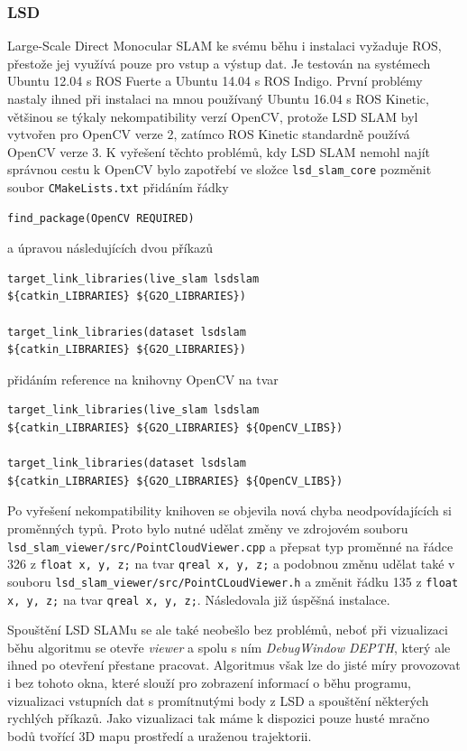 \documentclass[12pt,a4paper]{article}
\begin{document}
\subsubsection{LSD}
Large-Scale Direct Monocular SLAM ke svému běhu i instalaci vyžaduje ROS, přestože jej využívá pouze pro vstup a výstup dat. Je testován na systémech Ubuntu 12.04 s ROS Fuerte a Ubuntu 14.04 s ROS Indigo. První problémy nastaly ihned při instalaci na mnou používaný Ubuntu 16.04 s ROS Kinetic, většinou se týkaly nekompatibility verzí OpenCV, protože LSD SLAM byl vytvořen pro OpenCV verze 2, zatímco ROS Kinetic standardně používá OpenCV verze 3. K vyřešení těchto problémů, kdy LSD SLAM nemohl najít správnou cestu k OpenCV bylo zapotřebí ve složce \texttt{lsd\_slam\_core} pozměnit soubor \texttt{CMakeLists.txt} přidáním řádky
\begin{verbatim}
find_package(OpenCV REQUIRED)
\end{verbatim}
a úpravou následujících dvou příkazů
\begin{verbatim}
target_link_libraries(live_slam lsdslam 
${catkin_LIBRARIES} ${G2O_LIBRARIES})

target_link_libraries(dataset lsdslam 
${catkin_LIBRARIES} ${G2O_LIBRARIES})
\end{verbatim}
přidáním reference na knihovny OpenCV na tvar
\begin{verbatim}
target_link_libraries(live_slam lsdslam 
${catkin_LIBRARIES} ${G2O_LIBRARIES} ${OpenCV_LIBS})

target_link_libraries(dataset lsdslam 
${catkin_LIBRARIES} ${G2O_LIBRARIES} ${OpenCV_LIBS})
\end{verbatim}

Po vyřešení nekompatibility knihoven se objevila nová chyba neodpovídajících si \newline proměnných typů. Proto bylo nutné udělat změny ve zdrojovém souboru \newline \texttt{lsd\_slam\_viewer/src/PointCloudViewer.cpp} a přepsat typ proměnné na řádce 326 z \texttt{float x, y, z;} na tvar \texttt{qreal x, y, z;} a podobnou změnu udělat také v souboru \texttt{lsd\_slam\_viewer/src/PointCLoudViewer.h} a změnit řádku 135 z \texttt{float x, y, z;} na tvar \texttt{qreal x, y, z;}. Následovala již úspěšná instalace.

Spouštění LSD SLAMu se ale také neobešlo bez problémů, neboť při vizualizaci běhu algoritmu se otevře \textit{viewer} a spolu s ním \textit{DebugWindow DEPTH}, který ale ihned po otevření přestane pracovat. Algoritmus však lze do jisté míry provozovat i bez tohoto okna, které slouží pro zobrazení informací o běhu programu, vizualizaci vstupních dat s promítnutými body z LSD a spouštění některých rychlých příkazů. Jako vizualizaci tak máme k dispozici pouze husté mračno bodů tvořící 3D mapu prostředí a uraženou trajektorii.
\end{document}
